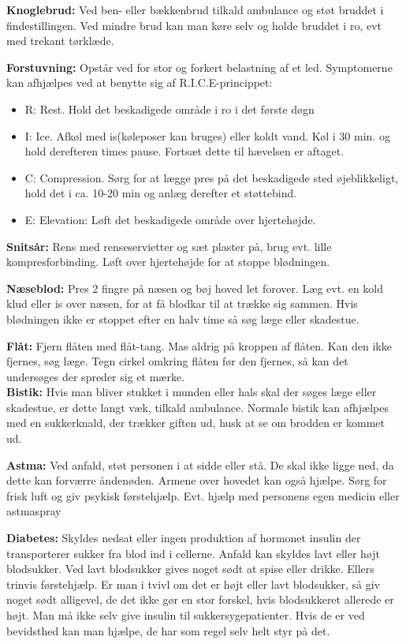 \textbf{Knoglebrud:} Ved ben- eller bækkenbrud tilkald ambulance og støt bruddet i findestillingen. Ved mindre brud kan man køre selv og holde bruddet i ro, evt med trekant tørklæde.


\textbf{Forstuvning:} Opstår ved for stor og forkert belastning af et led. Symptomerne kan afhjælpes ved at benytte sig af R.I.C.E-princippet:
\begin{itemize}
    \item R: Rest. Hold det beskadigede område i ro i det første døgn
    \item I: Ice. Afkøl med is(køleposer kan bruges) eller koldt vand. Køl i 30 min. og hold derefteren times pause. Fortsæt dette til hævelsen er aftaget.
    \item C: Compression. Sørg for at lægge pres på det beskadigede sted øjeblikkeligt, hold det i ca. 10-20 min og anlæg derefter et støttebind.
    \item E: Elevation: Løft det beskadigede område over hjertehøjde.
\end{itemize}

\textbf{Snitsår:} Rens med renseservietter og sæt plaster på, brug evt. lille kompresforbinding. Løft over hjertehøjde for at stoppe blødningen.


\textbf{Næseblod:} Pres 2 fingre på næsen og bøj hoved let forover. Læg evt. en kold klud eller is over næsen, for at få blodkar til at trække sig sammen. Hvis blødningen ikke er stoppet efter en halv time så søg læge eller skadestue.


\textbf{Flåt:} Fjern flåten med flåt-tang. Mas aldrig på kroppen af flåten. Kan den ikke fjernes, søg læge. Tegn cirkel omkring flåten før den fjernes, så kan det undersøges der spreder sig et mærke.\\
\newline
\textbf{Bistik:} Hvis man bliver stukket i munden eller hals skal der søges læge eller skadestue, er dette langt væk, tilkald ambulance. Normale bistik kan afhjælpes med en sukkerknald, der trækker giften ud, husk at se om brodden er kommet ud. 


\textbf{Astma:} Ved anfald, støt personen i at sidde eller stå. De skal ikke ligge ned, da dette kan forværre åndenøden. Armene over hovedet kan også hjælpe. Sørg for frisk luft og giv psykisk førstehjælp. Evt. hjælp med personens egen medicin eller astmaspray 


\textbf{Diabetes:} Skyldes nedsat eller ingen produktion af hormonet insulin der transporterer sukker fra blod ind i cellerne. Anfald kan skyldes lavt eller højt blodsukker. Ved lavt blodsukker gives noget sødt at spise eller drikke. Ellers trinvis førstehjælp. Er man i tvivl om det er højt eller lavt blodsukker, så giv noget sødt alligevel, de det ikke gør en stor forskel, hvis blodsukkeret allerede er højt. Man må ikke selv give insulin til sukkersygepatienter. Hvis de er ved bevidsthed kan man hjælpe, de har som regel selv helt styr på det.


